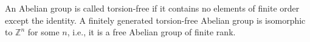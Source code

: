 An Abelian group is called torsion-free if it contains no elements of finite order except the identity. A finitely generated torsion-free Abelian group is isomorphic to $\mathbb{Z}^n$ for some $n$, i.e., it is a free Abelian group of finite rank.
